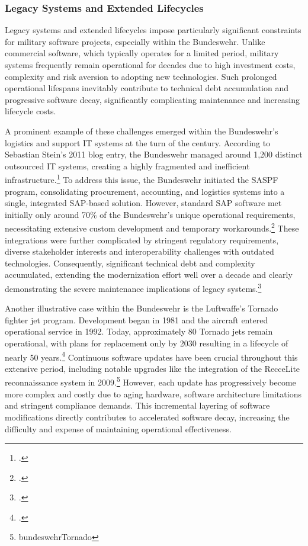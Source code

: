 \subsubsection{Legacy Systems and Extended Lifecycles}
Legacy systems and extended lifecycles impose particularly significant constraints for military software projects, especially within the Bundeswehr. 
Unlike commercial software, which typically operates for a limited period, military systems frequently remain operational for decades due to high investment costs, complexity and risk aversion to adopting new technologies. Such prolonged operational 
lifespans inevitably contribute to technical debt accumulation and progressive software decay, significantly complicating maintenance and increasing lifecycle costs.

A prominent example of these challenges emerged within the Bundeswehr's logistics and support IT systems at the turn of the century. According to Sebastian Stein's 2011 blog entry,
the Bundeswehr managed around 1,200 distinct outsourced IT systems, creating a highly fragmented and inefficient infrastructure.\footcite{steinBusinessProcessManagement2011} To address this issue, the Bundeswehr initiated the \ac{SASPF} program, consolidating procurement, accounting, 
and logistics systems into a single, integrated SAP-based solution. However, standard SAP software met initially only around 70\% of the Bundeswehr's unique operational requirements, necessitating extensive custom development and temporary workarounds.\footcite{steinBusinessProcessManagement2011} These integrations were further 
complicated by stringent regulatory requirements, diverse stakeholder interests and interoperability challenges with outdated technologies. Consequently, significant technical debt and complexity accumulated, extending the modernization effort well over a decade and clearly demonstrating the severe maintenance implications of legacy systems.\footcite{steinBusinessProcessManagement2011}

Another illustrative case within the Bundeswehr is the Luftwaffe's Tornado fighter jet program. Development began in 1981 and the aircraft entered operational service in 1992. Today, approximately 80 Tornado jets remain operational, with plans for 
replacement only by 2030 resulting in a lifecycle of nearly 50 years.\footcite{skibaTornado50Jahre2024} Continuous software updates have been crucial throughout this extensive period, including notable upgrades like the integration of the RecceLite reconnaissance system in 2009.\footnote{bundeswehrTornado} However, 
each update has progressively become more complex and costly due to aging hardware, software architecture limitations and stringent compliance demands. This incremental layering of software modifications directly contributes to accelerated software decay, increasing the difficulty and expense of maintaining operational effectiveness.

